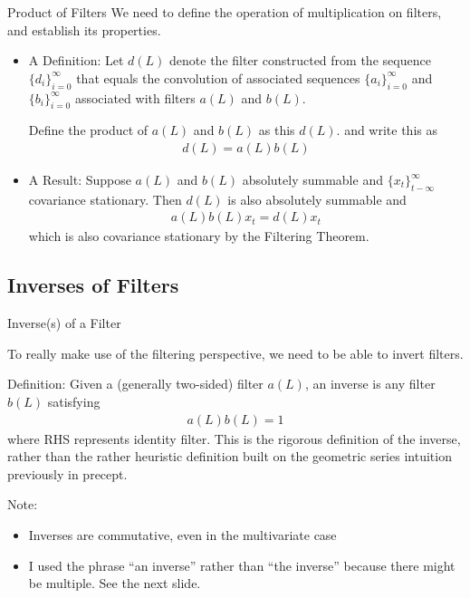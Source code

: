 \documentclass[aspectratio=169, handout]{beamer}
\begin{document}
{\footnotesize
\begin{frame}{Product of Filters}
We need to define the operation of multiplication on filters, and
establish its properties.
\begin{itemize}
  \item
    \alert{A Definition}:
    Let $d(L)$ denote the filter constructed from the sequence
    $\{d_i\}_{i=0}^\infty$ that equals the convolution of associated
    sequences $\{a_i\}_{i=0}^\infty$ and $\{b_i\}_{i=0}^\infty$
    associated with filters $a(L)$ and $b(L)$.
    \pause

    Define the \alert{product} of $a(L)$ and $b(L)$ as this $d(L)$.
    and write this as
    \begin{align*}
      d(L) = a(L) b(L)
    \end{align*}
    \pause

  \item
    \alert{A Result}:
    Suppose $a(L)$ and $b(L)$ absolutely summable and
    $\{x_t\}_{t-\infty}^\infty$ covariance stationary.
    Then $d(L)$ is also absolutely summable and
    \begin{align*}
      a(L)b(L)x_t = d(L) x_t
    \end{align*}
    which is also covariance stationary by the Filtering Theorem.

\end{itemize}
\end{frame}
}


\subsection{Inverses of Filters}

{\footnotesize
\begin{frame}{Inverse(s) of a Filter}

To really make use of the filtering perspective, we need to be able to
\alert{invert} filters.
\pause

\alert{Definition}:
Given a (generally two-sided) filter $a(L)$, an \alert{inverse} is any
filter $b(L)$ satisfying
\begin{align}
  a(L) b(L) = 1
\end{align}
where RHS represents \alert{identity filter}.
\pause
This is the \alert{rigorous} definition of the inverse, rather
than the rather heuristic definition built on the geometric series
intuition previously in precept.

\pause
\alert{Note}:
\begin{itemize}
  \item Inverses are commutative, even in the multivariate case
  \pause
  \item I used the phrase ``an inverse'' rather than ``the inverse''
    because there might be multiple.
    See the next slide.
  \pause
\end{itemize}
\end{frame}
}
\end{document}
